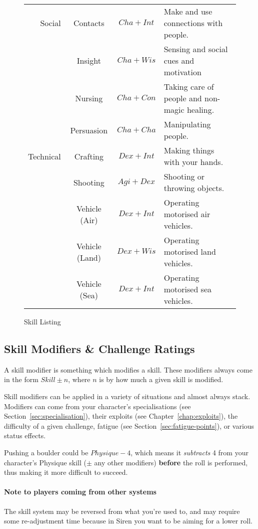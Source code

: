 \begin{figure}
\begin{tabular}{r | c | c | l}
    Social    & Contacts         & $Cha+Int$ & Make and use connections with people.         \\
              & Insight          & $Cha+Wis$ & Sensing and social cues and motivation        \\
              & Nursing          & $Cha+Con$ & Taking care of people and non-magic healing.  \\
              & Persuasion       & $Cha+Cha$ & Manipulating people.                          \\\hline
    Technical & Crafting         & $Dex+Int$ & Making things with your hands.                \\
              & Shooting         & $Agi+Dex$ & Shooting or throwing objects.                 \\
              & Vehicle (Air)    & $Dex+Int$ & Operating motorised air vehicles.             \\
              & Vehicle (Land)   & $Dex+Wis$ & Operating motorised land vehicles.            \\
              & Vehicle (Sea)    & $Dex+Int$ & Operating motorised sea vehicles.             \\
\end{tabular}
\caption{Skill Listing}
\label{fig:skills}
\end{figure}

\subsection{Skill Modifiers \& Challenge Ratings}
A skill modifier is something which modifies a skill.
These modifiers always come in the form $Skill \pm n$, where $n$ is by how much a given skill is modified.

Skill modifiers can be applied in a variety of situations and almost always stack.
Modifiers can come from your character's specialisations (see Section~\ref{sec:specialisation}), their exploits (see Chapter~\ref{chap:exploits}), the difficulty of a given challenge, fatigue (see Section~\ref{sec:fatigue-points}), or various status effects.

Pushing a boulder could be $\mathit{Physique} - 4$, which means it \textit{subtracts} 4 from your character's Physique skill ($\pm$ any other modifiers) \textbf{before} the roll is performed, thus making it more difficult to succeed.

\paragraph{Note to players coming from other systems} The skill system may be reversed from what you're used to, and may require some re-adjustment time because in Siren you want to be aiming for a lower roll.

